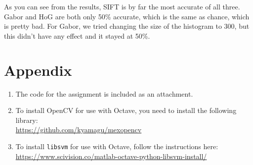 \documentclass{article}
\begin{document}
  As you can see from the results, SIFT is by far the most accurate of all three. Gabor and HoG are both only 50\% accurate, which is the same as chance, which is pretty bad. For Gabor, we tried changing the size of the histogram to 300, but this didn't have any effect and it stayed at 50\%.

  \newpage

  \section{Appendix}

  \begin{enumerate}
    \item The code for the assignment is included as an attachment.
    \item To install OpenCV for use with Octave, you need to install the following library:\\
          \url{https://github.com/kyamagu/mexopencv}
    \item To install \texttt{libsvm} for use with Octave, follow the instructions here:\\
          \url{https://www.scivision.co/matlab-octave-python-libsvm-install/}
  \end{enumerate}
\end{document}
